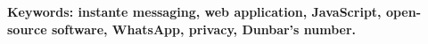 \begin{comment}
	The use of instant messaging applications has become a vital component of interpersonal communication, especially for individuals who do not have the opportunity to interact on a daily basis. WhatsApp, one of the most popular instant messaging platforms, reported sending approximately 200 billion messages per day in October 2020, and currently has over 2 billion users.
	
	In 1992, Robin Dunbar proposed Dunbar's number, which approximates the number of people with whom an individual can maintain stable social relationships at around 150. Understanding the objective state of personal relationships within our social circles can be crucial for maintaining, preserving, and improving strong, lasting, and healthy relationships.
	
	This thesis presents the design and implementation of a web application that aims to provide users with a tool to analyze and understand their WhatsApp chats in a visual and easily comprehensible way. The application allows users to gain insights into their social interactions and relationships, taking into account Dunbar's number.
	
	Privacy is a major concern in the realm of personal conversations, and it has been considered a primary concern during the development of this application. To protect user data, the entire application is sent to the client, and all necessary operations are executed on the client's device. Additionally, the application is open-source, and the code is freely accessible for reading and modification by users and contributors under the \acrfull{gplv3} license.\cite{GPLv3} The application is built using React.
	
	Overall, this thesis presents the design and implementation of a web application that allows users to analyze their WhatsApp chats and gain insights into their social interactions and relationships, all while ensuring data privacy and accessibility under an open-source license.
\end{comment}

\vfill
\textbf{Keywords: instante messaging, web application, JavaScript, open-source software, WhatsApp, privacy, Dunbar's number.} 